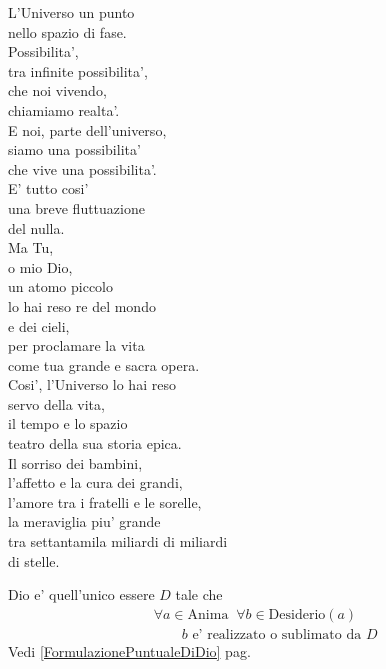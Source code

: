 \begin{haiku}
    L'Universo un punto\\
    nello spazio di fase.\\
    Possibilita',\\
    tra infinite possibilita',\\
    che noi vivendo,\\
    chiamiamo realta'.\\
    E noi, parte dell'universo,\\
    siamo una possibilita'\\
    che vive una possibilita'.\\
    E' tutto cosi' \\
    una breve fluttuazione \\
    del nulla.\\
    Ma Tu,\\
    o mio Dio,\\
    un atomo piccolo\\
    lo hai reso re del mondo\\
    e dei cieli,\\
    per proclamare la vita \\
    come tua grande e sacra opera.\\
    Cosi', l'Universo lo hai reso\\
    servo della vita,\\
    il tempo e lo spazio\\
    teatro della sua storia epica.\\
    Il sorriso dei bambini,\\
    l'affetto e la cura dei grandi,\\
    l'amore tra i fratelli e le sorelle,\\
    la meraviglia piu' grande\\
    tra settantamila miliardi di miliardi\\
    di stelle.\\
\end{haiku}

\begin{vcentered}
Dio e' quell'unico essere $D$ tale che
    \begin{align*}
        &\forall a \in \textrm{Anima}\;\;\forall b \in \textrm{Desiderio}(a)\;\;\\
        &\quad\quad b\textrm{ e' realizzato o sublimato da }D
    \end{align*}
    Vedi \ref{FormulazionePuntualeDiDio} pag. \pageref{FormulazionePuntualeDiDio}
\end{vcentered}

